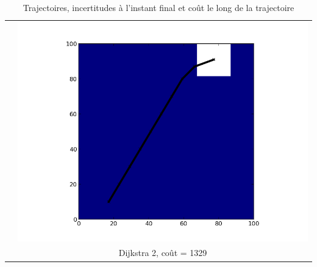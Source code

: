 \begin{table}
\begin{tabular}{cc}
&\includegraphics[scale=0.42]{../data/gradient_dijkstra_const/plot_A_10_17_B_91_77_iteration_009.png} \\
&Dijkstra 2, coût = 1329\\
\end{tabular}
\caption{Trajectoires, incertitudes à l'instant final et coût le long de la trajectoire}
\label{tab_const}
\end{table}
